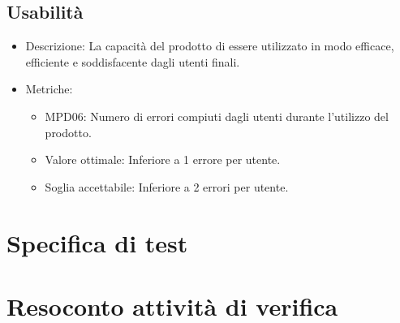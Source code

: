 \documentclass[12pt]{article}
\begin{document}
\subsection{Usabilità}
\begin{itemize}
	\item Descrizione: La capacità del prodotto di essere utilizzato in modo efficace, efficiente e soddisfacente dagli utenti finali.
	\item Metriche:
	      \begin{itemize}
		      \item MPD06: Numero di errori compiuti dagli utenti durante l'utilizzo del prodotto.
		      \item Valore ottimale: Inferiore a 1 errore per utente.
		      \item Soglia accettabile: Inferiore a 2 errori per utente.
	      \end{itemize}
\end{itemize}

\section{Specifica di test}
\section {Resoconto attività di verifica}
\end{document}
